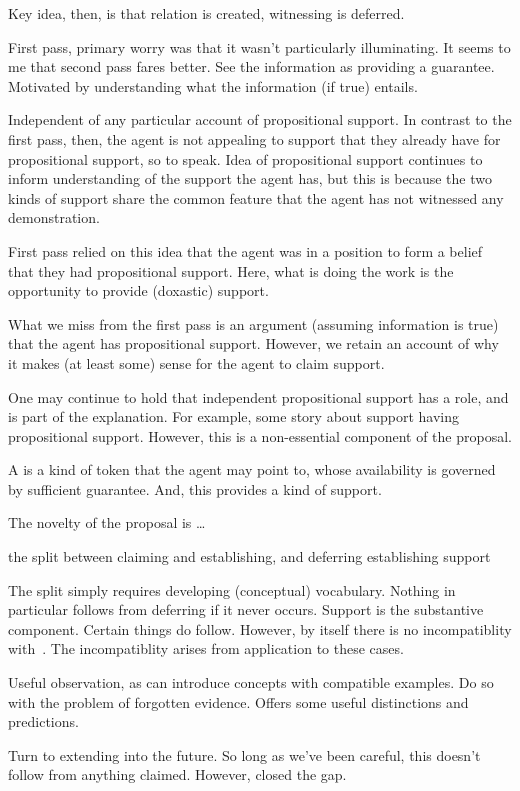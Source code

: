 \begin{note}
  Key idea, then, is that relation is created, witnessing is deferred.

  First pass, primary worry was that it wasn't particularly illuminating.
  It seems to me that second pass fares better.
  See the information as providing a guarantee.
  Motivated by understanding what the information (if true) entails.

  Independent of any particular account of propositional support.
  In contrast to the first pass, then, the agent is not appealing to support that they already have for propositional support, so to speak.
  Idea of propositional support continues to inform understanding of the support the agent has, but this is because the two kinds of support share the common feature that the agent has not witnessed any demonstration.

  First pass relied on this idea that the agent was in a position to form a belief that they had propositional support.
  Here, what is doing the work is the opportunity to provide (doxastic) support.

  What we miss from the first pass is an argument (assuming information is true) that the agent has propositional support.
  However, we retain an account of why it makes (at least some) sense for the agent to claim support.

  One may continue to hold that independent propositional support has a role, and is part of the explanation.
  For example, some story about support having propositional support.
  However, this is a non-essential component of the proposal.

  A \future{} is a kind of token that the agent may point to, whose availability is governed by sufficient guarantee.
  And, this provides a kind of support.
\end{note}

\begin{note}[Novelty]
  The novelty of the proposal is \dots

  the split between claiming and establishing, and deferring establishing
  support

  The split simply requires developing (conceptual) vocabulary.
  Nothing in particular follows from deferring if it never occurs.
  Support is the substantive component.
  Certain things do follow.
  However, by itself there is no incompatiblity with~\ESU{}.
  The incompatiblity arises from application to these cases.

  Useful observation, as can introduce concepts with compatible examples.
  Do so with the problem of forgotten evidence.
  Offers some useful distinctions and predictions.

  Turn to extending into the future.
  So long as we've been careful, this doesn't follow from anything claimed.
  However, closed the gap.
\end{note}

